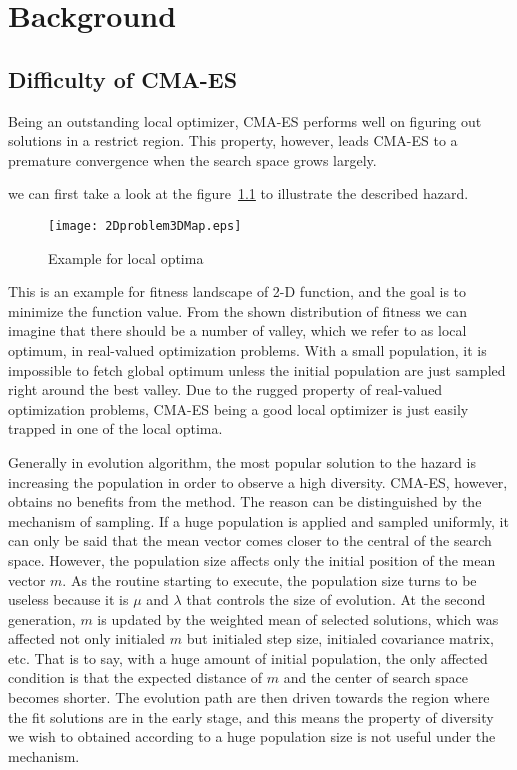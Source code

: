 \chapter{Background}
\label{ch:background}

\section{Difficulty of CMA-ES}

Being an outstanding local optimizer, CMA-ES performs well on figuring out solutions in a restrict region.
This property, however, leads CMA-ES to a premature convergence when the search space grows largely.

we can first take a look at the figure~\ref{fig:localExample} to illustrate the described hazard.
\begin{figure}[h]
\begin{center}
\texttt{[image: 2Dproblem3DMap.eps]}
\caption{Example for local optima}
\label{fig:localExample}
\end{center}
\end{figure}
This is an example for fitness landscape of 2-D function, and the goal is to minimize the function value.
From the shown distribution of fitness we can imagine that there should be a number of valley, which we refer to as local optimum, in real-valued optimization problems.
With a small population, it is impossible to fetch global optimum unless the initial population are just sampled right around the best valley.
Due to the rugged property of real-valued optimization problems, CMA-ES being a good local optimizer is just easily trapped in one of the local optima.

Generally in evolution algorithm, the most popular solution to the hazard is increasing the population in order to observe a high diversity.
CMA-ES, however, obtains no benefits from the method.
The reason can be distinguished by the mechanism of sampling.
If a huge population is applied and sampled uniformly, it can only be said that the mean vector comes closer to the central of the search space.
However, the population size affects only the initial position of the mean vector $m$.
As the routine starting to execute, the population size turns to be useless because it is $\mu$ and $\lambda$ that controls the size of evolution.
At the second generation, $m$ is updated by the weighted mean of selected solutions, which was affected not only initialed $m$ but initialed step size, initialed covariance matrix, etc.
That is to say, with a huge amount of initial population, the only affected condition is that the expected distance of $m$ and the center of search space becomes shorter. 
The evolution path are then driven towards the region where the fit solutions are in the early stage, and this means the property of diversity we wish to obtained according to a huge population size is not useful under the mechanism.
 


